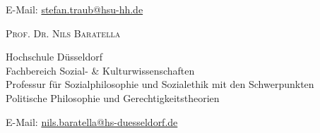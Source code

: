 \documentclass[a4paper,10pt]{article}
\begin{document}
E-Mail: \href{mailto:stefan.traub@hsu-hh.de}{stefan.traub@hsu-hh.de}\vspace{12pt}

\textsc{Prof\hspace{0.5pt}. Dr\hspace{0.5pt}. Nils Baratella}

Hochschule Düsseldorf\\
Fachbereich Sozial- \& Kulturwissenschaften\\
Professur für Sozialphilosophie und Sozialethik mit den Schwerpunkten\\
Politische Philosophie und Gerechtigkeitstheorien

E-Mail: \href{mailto:nils.baratella@hs-duesseldorf.de}{nils.baratella@hs-duesseldorf.de}\\
\end{document}
